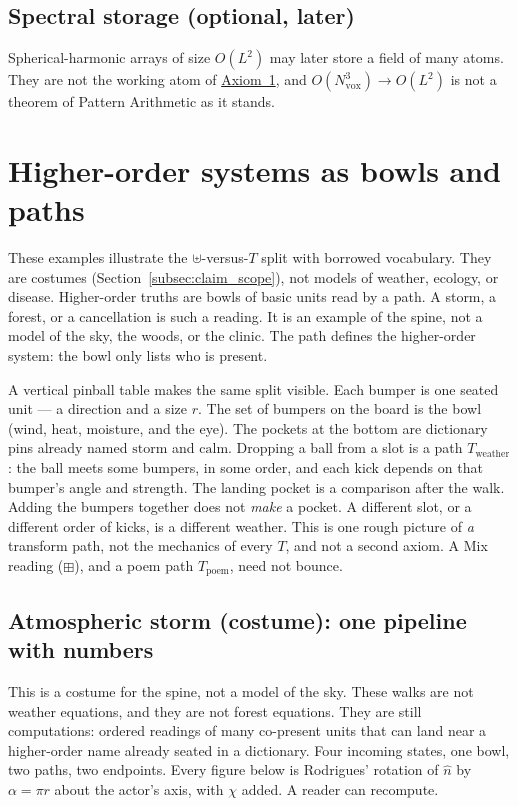 \documentclass[12pt, a4paper]{article}
\begin{document}
\subsection{Spectral storage (optional, later)}
Spherical-harmonic arrays of size $O(L^2)$ may later store a field of
many atoms. They are not the working atom of
\hyperref[subsec:axiom1]{Axiom~1}, and $O(N_{\mathrm{vox}}^3)\to O(L^2)$ is not a theorem of
Pattern Arithmetic as it stands.

\section{Higher-order systems as bowls and paths}
\label{sec:higher_order}
These examples illustrate the $\uplus$-versus-$T$ split with borrowed
vocabulary. They are costumes
(Section~\ref{subsec:claim_scope}), not models of weather, ecology,
or disease.
Higher-order truths are bowls of basic units read by a path.
A storm, a forest, or a cancellation is such a reading.
It is an example of the spine, not a model of the sky, the woods,
or the clinic. The path defines the higher-order system: the bowl
only lists who is present.

A vertical pinball table makes the same split visible. Each bumper
is one seated unit --- a direction and a size \(r\). The set of
bumpers on the board is the bowl (wind, heat, moisture, and
the eye). The pockets at the bottom are dictionary pins already
named \(\mathrm{storm}\) and \(\mathrm{calm}\). Dropping a ball from
a slot is a path \(T_{\mathrm{weather}}\): the ball meets some
bumpers, in some order, and each kick depends on that bumper's
angle and strength. The landing pocket is a comparison after the
walk. Adding the bumpers together does not \emph{make} a pocket.
A different slot, or a different order of kicks, is a different
weather. This is one rough picture of \emph{a} transform path, not
the mechanics of every $T$, and not a second axiom. A Mix reading ($\boxplus$), and a poem path $T_{\mathrm{poem}}$, need not bounce.

\subsection{Atmospheric storm (costume): one pipeline with numbers}
\label{subsec:storm_pipeline}
This is a costume for the spine, not a model of the sky.
These walks are not weather equations, and they are not forest
equations. They are still computations: ordered readings of many
co-present units that can land near a higher-order name already
seated in a dictionary.
Four incoming
states, one bowl, two paths, two endpoints. Every figure below is
Rodrigues' rotation of $\hat n$ by $\alpha=\pi r$ about the actor's
axis, with $\chi$ added. A reader can recompute.
\end{document}
